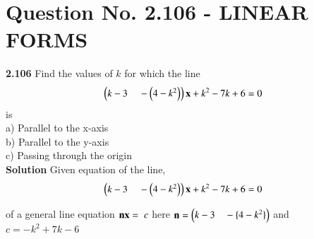 \documentclass[journal,12pt,twocolumn]{IEEEtran}
\begin{document}
\section{\textbf{Question No. 2.106 - LINEAR FORMS}}
\textbf{2.106 }Find the values of $k$ for which the line
\begin{align}
\myvec{k-3 \hspace{4mm}-\myvec{4-k^2}}\vec{x}+k^2-7k+6=0
\end{align}
is\\
a) Parallel to the x-axis\\
b) Parallel to the y-axis\\
c) Passing through the origin\\
%
\vskip 0.5cm
\textbf{Solution} Given equation of the line, 
\begin{align}
\myvec{k-3 \hspace{4mm}-\myvec{4-k^2}}\vec{x}+k^2-7k+6=0\label{eq:1}
\end{align}
\begin{center}
 \begin{sloppypar}of a general line equation\hspace{4mm} ${\vec{nx = }\hspace{2mm}c}$\newline
here ${\vec{n}=\myvec{k-3 \hspace{3.5mm}-\{4-k^2\}}}$\newline
and\hspace{4mm} ${c = -k^2+7k-6}$\end{sloppypar}\end{center}
\end{document}
